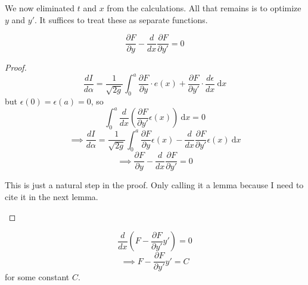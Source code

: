 \documentclass[11pt]{scrartcl}
\begin{document}
\begin{remark*}
    We now eliminated $t$ and $x$ from the calculations. All that remains is to optimize $y$ and $y'$. It suffices to treat these as separate functions. 
\end{remark*}

\begin{lemma*}
\[\frac{\partial F}{\partial y} - \frac{d}{dx}\frac{\partial F}{\partial y'} = 0\]
\end{lemma*}

\begin{proof}

 \[\frac{dI}{d\alpha} = \frac{1}{\sqrt{2g}} \int_0^a \frac{\partial F}{\partial y} \cdot e(x) + \frac{\partial F}{\partial y'} \cdot \frac{d\epsilon}{dx} \ \mathrm dx\] but $\epsilon(0) = \epsilon(a) = 0$, so \[\int_0^a \frac{d}{dx}\left ( \frac{\partial F}{\partial y'}\epsilon(x) \right ) \ \mathrm dx = 0\] \[\implies \frac{dI}{d\alpha} = \frac{1}{\sqrt{2g}} \int_0^a \frac{\partial F}{\partial y} \epsilon(x) - \frac{d}{dx} \frac{\partial F}{\partial y'} \epsilon(x) \ \mathrm dx\] \[ \implies \frac{\partial F}{\partial y} - \frac{d}{dx}\frac{\partial F}{\partial y'} = 0\] 

 \begin{remark*}
     This is just a natural step in the proof. Only calling it a lemma because I need to cite it in the next lemma. 
 \end{remark*}

\end{proof}





\begin{lemma*}
    \[\frac{d}{dx} \left ( F - \frac{\partial F}{\partial y'} y' \right ) = 0\]
    \[\implies F - \frac{\partial F}{\partial y'}y' = C\] for some constant $C$. 
\end{lemma*}
\end{document}
